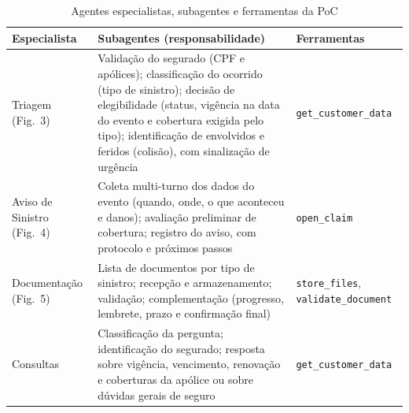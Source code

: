 \begin{table}[htbp]
\centering
\caption{Agentes especialistas, subagentes e ferramentas da PoC}
\label{tab:poc-agentes}
\small
\begin{tabular}{|p{2.6cm}|p{7.2cm}|p{3.4cm}|}
\hline
\textbf{Especialista} & \textbf{Subagentes (responsabilidade)} & \textbf{Ferramentas} \\
\hline
Triagem (Fig.~3) &
Validação do segurado (CPF e apólices); classificação do ocorrido (tipo de sinistro);
decisão de elegibilidade (status, vigência na data do evento e cobertura exigida pelo
tipo); identificação de envolvidos e feridos (colisão), com sinalização de urgência &
\texttt{get\_customer\_data} \\
\hline
Aviso de Sinistro (Fig.~4) &
Coleta multi-turno dos dados do evento (quando, onde, o que aconteceu e danos);
avaliação preliminar de cobertura; registro do aviso, com protocolo e próximos passos &
\texttt{open\_claim} \\
\hline
Documentação (Fig.~5) &
Lista de documentos por tipo de sinistro; recepção e armazenamento; validação;
complementação (progresso, lembrete, prazo e confirmação final) &
\texttt{store\_files}, \texttt{validate\_document} \\
\hline
Consultas &
Classificação da pergunta; identificação do segurado; resposta sobre vigência,
vencimento, renovação e coberturas da apólice ou sobre dúvidas gerais de seguro &
\texttt{get\_customer\_data} \\
\hline
\end{tabular}
\end{table}

